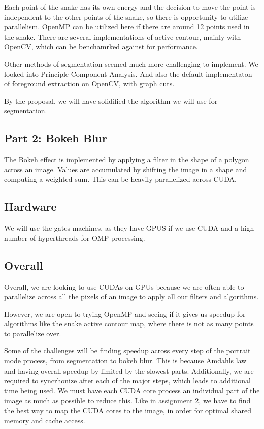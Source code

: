 \documentclass[12pt]{article}
\begin{document}
Each point of the snake has its own energy and the decision to move the point
is independent to the other points of the snake, so there is opportunity to
utilize parallelism. OpenMP can be utilized here if there are around 12 points
used in the snake. There are several implementations of active contour, mainly
with OpenCV, which can be benchamrked against for performance. \cite{cv-active}

Other methods of segmentation seemed much more challenging to implement. We
looked into Principle Component Analysis. \cite{pca-git} \cite{pca-paper} And
also the default implementaton of foreground extraction on OpenCV, with graph
cuts. \cite{cv-graphcut} \cite{grabcut-paper}

By the proposal, we will have solidified the algorithm we will use for
segmentation.

\subsection{Part 2: Bokeh Blur}

The Bokeh effect is implemented by applying a filter in the shape of a polygon
across an image. Values are accumulated by shifting the image in a shape and
computing a weighted sum. This can be heavily parallelized across CUDA.
\cite{bokeh}

\subsection{Hardware}

We will use the gates machines, as they have GPUS if we use CUDA and a high
number of hyperthreads for OMP processing.

\subsection{Overall}

Overall, we are looking to use CUDAs on GPUs because we are often able to
parallelize across all the pixels of an image to apply all our filters and
algorithms.

However, we are open to trying OpenMP and seeing if it gives us speedup for
algorithms like the snake active contour map, where there is not as many points
to parallelize over.

Some of the challenges will be finding speedup across every step of the
portrait mode process, from segmentation to bokeh blur. This is because Amdahls
law and having overall speedup by limited by the slowest parts. Additionally,
we are required to syncrhonize after each of the major steps, which leads to
additional time being used. We must have each CUDA core process an individual
part of the image as much as possible to reduce this. Like in assignment 2, we
have to find the best way to map the CUDA cores to the image, in order for
optimal shared memory and cache access.
\end{document}
